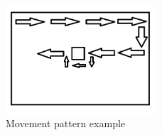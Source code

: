 \documentclass[10pt,a4paper]{article}
\begin{document}
\begin{flushleft}
\begin{figure}[h]
\centering
\includegraphics[width=0.5\textwidth]{figures/scanline_example.png} 
\caption{Movement pattern example}
\label{Picture 2}
\end{figure}

\nocite{*}
\newpage

\end{flushleft}
\end{document}
